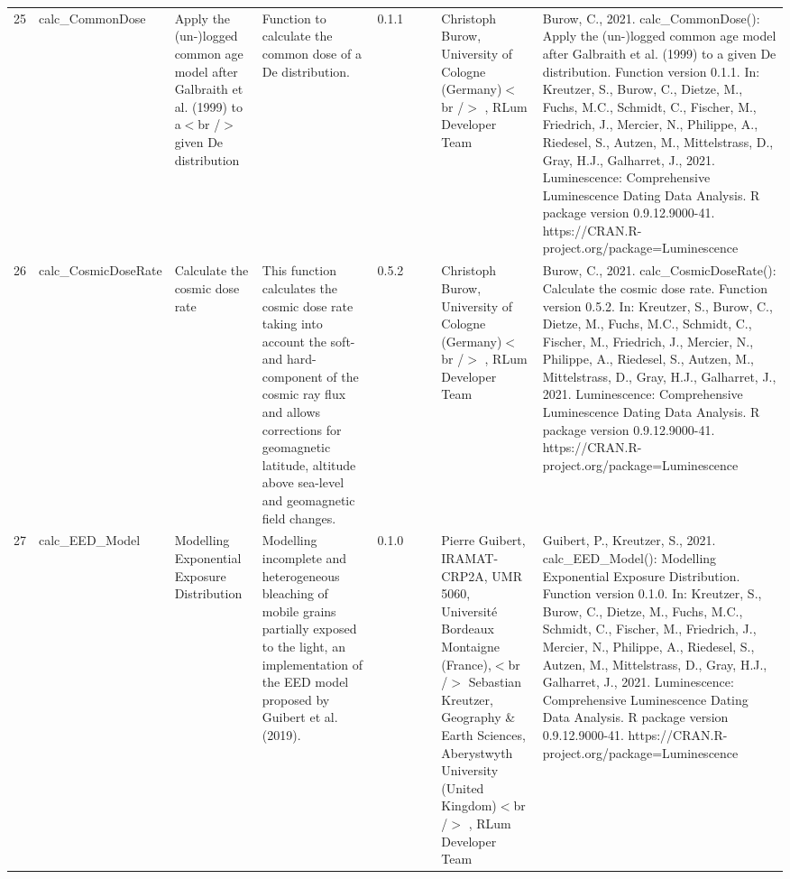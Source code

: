 \begin{table}[ht]
\begin{tabular}{rllllllll}
 \\ 
  25 & calc\_CommonDose & Apply the (un-)logged common age model after Galbraith et al. (1999) to a$<$br /$>$ given De distribution & Function to calculate the common dose of a De distribution. & 0.1.1
 &  &  & Christoph Burow, University of Cologne (Germany)$<$br /$>$ , RLum Developer Team & Burow, C., 2021. calc\_CommonDose(): Apply the (un-)logged common age model after Galbraith et al. (1999) to a given De distribution. Function version 0.1.1. In: Kreutzer, S., Burow, C., Dietze, M., Fuchs, M.C., Schmidt, C., Fischer, M., Friedrich, J., Mercier, N., Philippe, A., Riedesel, S., Autzen, M., Mittelstrass, D., Gray, H.J., Galharret, J., 2021. Luminescence: Comprehensive Luminescence Dating Data Analysis. R package version 0.9.12.9000-41. https://CRAN.R-project.org/package=Luminescence
 \\ 
  26 & calc\_CosmicDoseRate & Calculate the cosmic dose rate & This function calculates the cosmic dose rate taking into account the soft- and hard-component of the cosmic ray flux and allows corrections for geomagnetic latitude, altitude above sea-level and geomagnetic field changes. & 0.5.2
 &  &  & Christoph Burow, University of Cologne (Germany)$<$br /$>$ , RLum Developer Team & Burow, C., 2021. calc\_CosmicDoseRate(): Calculate the cosmic dose rate. Function version 0.5.2. In: Kreutzer, S., Burow, C., Dietze, M., Fuchs, M.C., Schmidt, C., Fischer, M., Friedrich, J., Mercier, N., Philippe, A., Riedesel, S., Autzen, M., Mittelstrass, D., Gray, H.J., Galharret, J., 2021. Luminescence: Comprehensive Luminescence Dating Data Analysis. R package version 0.9.12.9000-41. https://CRAN.R-project.org/package=Luminescence
 \\ 
  27 & calc\_EED\_Model & Modelling Exponential Exposure Distribution & Modelling incomplete and heterogeneous bleaching of mobile grains partially exposed to the light, an implementation of the EED model proposed by Guibert et al. (2019). & 0.1.0
 &  &  & Pierre Guibert, IRAMAT-CRP2A, UMR 5060, Université Bordeaux Montaigne (France),$<$br /$>$ Sebastian Kreutzer, Geography \& Earth Sciences, Aberystwyth University (United Kingdom)$<$br /$>$ , RLum Developer Team & Guibert, P., Kreutzer, S., 2021. calc\_EED\_Model(): Modelling Exponential Exposure Distribution. Function version 0.1.0. In: Kreutzer, S., Burow, C., Dietze, M., Fuchs, M.C., Schmidt, C., Fischer, M., Friedrich, J., Mercier, N., Philippe, A., Riedesel, S., Autzen, M., Mittelstrass, D., Gray, H.J., Galharret, J., 2021. Luminescence: Comprehensive Luminescence Dating Data Analysis. R package version 0.9.12.9000-41. https://CRAN.R-project.org/package=Luminescence

\end{tabular}
\end{table}
